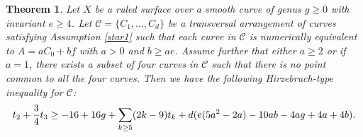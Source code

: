 \documentclass[12pt,reqno]{amsart}
\theoremstyle{plain}
\numberwithin{equation}{section}
\newtheorem{theorem}{Theorem}[section]
\theoremstyle{definition}
\begin{document}

	\begin{theorem}\cite[Equation 4.9]{HS} \label{HTIn}
		Let $X$ be a ruled surface over a smooth curve of genus $g \geq 0$ with invariant $e
		\ge 4$.  Let $\mathcal{C} = \{C_{1}, \ldots, C_{d}\}$ be a transversal arrangement of curves
		satisfying Assumption \ref{star1} such that each curve in
		$\mathcal{C}$ is numerically equivalent to $A=aC_0+bf$ with $a > 0$
		and $b \ge ae$. Assume further that either $a\geq 2$ or if $a=1$, there exists a subset of four curves in $\mathcal{C}$ such that there is no point common to all the four curves. Then we have the following Hirzebruch-type inequality for $\mathcal{C}$:\\
		\begin{equation*}\label{eq:Hirzebruch type ineq}
			t_{2}+\frac{3}{4}t_{3} \geq -16+16g+\sum_{k\geq5}(2k-9)t_{k}+
			d(e(5a^2-2a)-10ab-4ag+4a+4b).\\
		\end{equation*}	
	\end{theorem}
	
\end{document}
